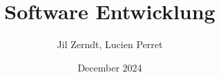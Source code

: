 \documentclass[a4paper, fontsize = 8pt, landscape]{scrartcl}
\title{Software Entwicklung}
\author{Jil Zerndt, Lucien Perret}
\date{December 2024}
\begin{document}
\begin{multicols}{3}
	\thispagestyle{TitlePageStyle}
	\maketitle
	
	\raggedcolumns
	
	
	
	
	
	\raggedcolumns
	
	
	
	
	
	\raggedcolumns
\end{multicols}
\end{document}
